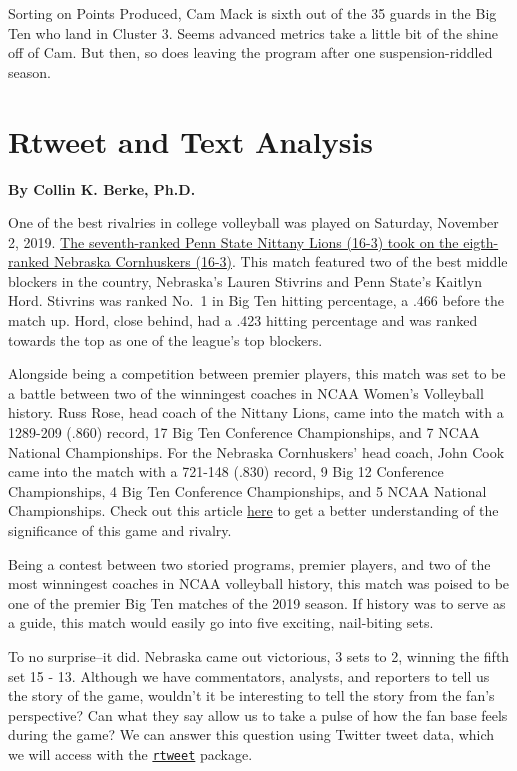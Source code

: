 \documentclass[
]{book}
\begin{document}
Sorting on Points Produced, Cam Mack is sixth out of the 35 guards in the Big Ten who land in Cluster 3. Seems advanced metrics take a little bit of the shine off of Cam. But then, so does leaving the program after one suspension-riddled season.

\hypertarget{rtweet-and-text-analysis}{%
\chapter{Rtweet and Text Analysis}\label{rtweet-and-text-analysis}}

\textbf{By Collin K. Berke, Ph.D.}

One of the best rivalries in college volleyball was played on Saturday, November 2, 2019. \href{https://journalstar.com/sports/huskers/volleyball/john-cook-on-the-radio-nebraska-penn-state-match-will/article_c1d5c426-e136-5ef2-b589-510a0f17da82.html}{The seventh-ranked Penn State Nittany Lions (16-3) took on the eigth-ranked Nebraska Cornhuskers (16-3)}. This match featured two of the best middle blockers in the country, Nebraska's Lauren Stivrins and Penn State's Kaitlyn Hord. Stivrins was ranked No.~1 in Big Ten hitting percentage, a .466 before the match up. Hord, close behind, had a .423 hitting percentage and was ranked towards the top as one of the league's top blockers.

Alongside being a competition between premier players, this match was set to be a battle between two of the winningest coaches in NCAA Women's Volleyball history. Russ Rose, head coach of the Nittany Lions, came into the match with a 1289-209 (.860) record, 17 Big Ten Conference Championships, and 7 NCAA National Championships. For the Nebraska Cornhuskers' head coach, John Cook came into the match with a 721-148 (.830) record, 9 Big 12 Conference Championships, 4 Big Ten Conference Championships, and 5 NCAA National Championships. Check out this article \href{https://www.ncaa.com/news/volleyball-women/article/2019-10-29/no-7-penn-state-vs-no-8-nebraska-volleyball-preview}{here} to get a better understanding of the significance of this game and rivalry.

Being a contest between two storied programs, premier players, and two of the most winningest coaches in NCAA volleyball history, this match was poised to be one of the premier Big Ten matches of the 2019 season. If history was to serve as a guide, this match would easily go into five exciting, nail-biting sets.

To no surprise--it did. Nebraska came out victorious, 3 sets to 2, winning the fifth set 15 - 13. Although we have commentators, analysts, and reporters to tell us the story of the game, wouldn't it be interesting to tell the story from the fan's perspective? Can what they say allow us to take a pulse of how the fan base feels during the game? We can answer this question using Twitter tweet data, which we will access with the \href{https://rtweet.info/}{\texttt{rtweet}} package.
\end{document}
